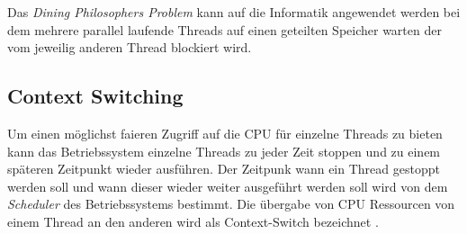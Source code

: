 Das \emph{Dining Philosophers Problem} kann auf die Informatik angewendet werden bei dem mehrere parallel laufende Threads auf einen geteilten Speicher warten der vom jeweilig anderen Thread blockiert wird. 

\subsection{Context Switching}
Um einen möglichst faieren Zugriff auf die CPU für einzelne Threads zu bieten kann das Betriebssystem einzelne Threads zu jeder Zeit stoppen und zu einem späteren Zeitpunkt wieder ausführen. Der Zeitpunk wann ein Thread gestoppt werden soll und wann dieser wieder weiter ausgeführt werden soll wird von dem \emph{Scheduler} des Betriebssystems bestimmt. Die übergabe von CPU Ressourcen von einem Thread an den anderen wird als Context-Switch bezeichnet \cite[p. 23]{Sto2013}. 






